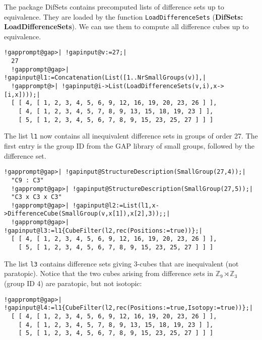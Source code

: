 \documentclass[a4paper,11pt]{report}
\begin{document}
{{ The package \textsf{DifSets} contains precomputed lists of difference sets up to equivalence. They are
loaded by the function \texttt{LoadDifferenceSets} (\textbf{DifSets: LoadDifferenceSets}). We can use them to compute all difference cubes up to equivalence. 
\begin{Verbatim}[commandchars=!@|,fontsize=\small,frame=single,label=Example]
  !gapprompt@gap>| !gapinput@v:=27;|
  27
  !gapprompt@gap>| !gapinput@l1:=Concatenation(List([1..NrSmallGroups(v)],|
  !gapprompt@>| !gapinput@i->List(LoadDifferenceSets(v,i),x->[i,x])));|
  [ [ 4, [ 1, 2, 3, 4, 5, 6, 9, 12, 16, 19, 20, 23, 26 ] ], 
    [ 4, [ 1, 2, 3, 4, 5, 7, 8, 9, 13, 15, 18, 19, 23 ] ], 
    [ 5, [ 1, 2, 3, 4, 5, 6, 7, 8, 9, 15, 23, 25, 27 ] ] ]
\end{Verbatim}
 The list \texttt{l1} now contains all inequivalent difference sets in groups of order 27. The first
entry is the group ID from the \textsf{GAP} library of small groups, followed by the difference set. 
\begin{Verbatim}[commandchars=!@|,fontsize=\small,frame=single,label=Example]
  !gapprompt@gap>| !gapinput@StructureDescription(SmallGroup(27,4));|
  "C9 : C3"
  !gapprompt@gap>| !gapinput@StructureDescription(SmallGroup(27,5));|
  "C3 x C3 x C3"
  !gapprompt@gap>| !gapinput@l2:=List(l1,x->DifferenceCube(SmallGroup(v,x[1]),x[2],3));;|
  !gapprompt@gap>| !gapinput@l3:=l1{CubeFilter(l2,rec(Positions:=true))};|
  [ [ 4, [ 1, 2, 3, 4, 5, 6, 9, 12, 16, 19, 20, 23, 26 ] ], 
    [ 5, [ 1, 2, 3, 4, 5, 6, 7, 8, 9, 15, 23, 25, 27 ] ] ]
\end{Verbatim}
 The list \texttt{l3} contains difference sets giving 3-cubes that are inequivalent (not paratopic).
Notice that the two cubes arising from difference sets in ${\ensuremath{\mathbb Z}}_9\rtimes {\ensuremath{\mathbb Z}}_3$ (group ID 4) are paratopic, but not isotopic: 
\begin{Verbatim}[commandchars=!@|,fontsize=\small,frame=single,label=Example]
  !gapprompt@gap>| !gapinput@l4:=l1{CubeFilter(l2,rec(Positions:=true,Isotopy:=true))};|
  [ [ 4, [ 1, 2, 3, 4, 5, 6, 9, 12, 16, 19, 20, 23, 26 ] ], 
    [ 4, [ 1, 2, 3, 4, 5, 7, 8, 9, 13, 15, 18, 19, 23 ] ], 
    [ 5, [ 1, 2, 3, 4, 5, 6, 7, 8, 9, 15, 23, 25, 27 ] ] ]
\end{Verbatim}
 

}}
\end{document}

